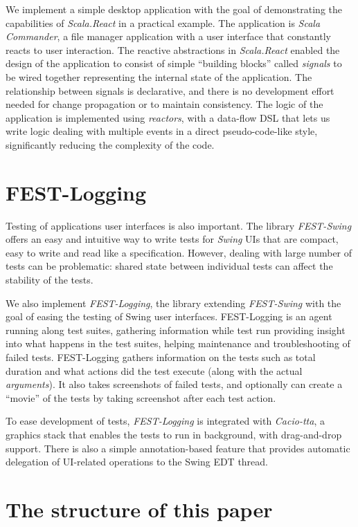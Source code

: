We implement a simple desktop application with the goal of demonstrating the capabilities of \emph{Scala.React} in a practical example. The application is \emph{Scala Commander}, a file manager application with a user interface that constantly reacts to user interaction. The reactive abstractions in \emph{Scala.React} enabled the design of the application to consist of simple ``building blocks'' called \emph{signals} to be wired together representing the internal state of the application. The relationship between signals is declarative, and there is no development effort needed for change propagation or to maintain consistency. The logic of the application is implemented using \emph{reactors}, with a data-flow DSL that lets us write logic dealing with multiple events in a direct pseudo-code-like style, significantly reducing the complexity of the code.

\section{FEST-Logging}

Testing of applications user interfaces is also important. The library \emph{FEST-Swing} offers an easy and intuitive way to write tests for \emph{Swing} UIs that are compact, easy to write and read like a specification. However, dealing with large number of tests can be problematic: shared state between individual tests can affect the stability of the tests. 

We also implement \emph{FEST-Logging}, the library extending \emph{FEST-Swing} with the goal of easing the testing of Swing user interfaces. FEST-Logging is an agent running along test suites, gathering information while test run providing insight into what happens in the test suites, helping maintenance and troubleshooting of failed tests. FEST-Logging gathers information on the tests such as total duration and what actions did the test execute (along with the actual \emph{arguments}). It also takes screenshots of failed tests, and optionally can create a ``movie'' of the tests by taking screenshot after each test action.

To ease development of tests, \emph{FEST-Logging} is integrated with \emph{Cacio-tta}, a graphics stack that enables the tests to run in background, with drag-and-drop support. There is also a simple annotation-based feature that provides automatic delegation of UI-related operations to the Swing EDT thread.

\section{The structure of this paper}

